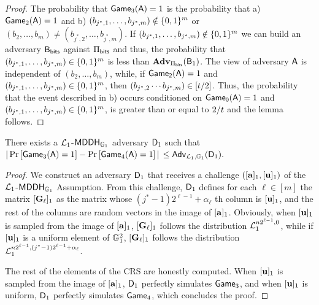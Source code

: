 \begin{proof}  The probability that
 \(\mathsf{Game}_3(\mathsf{A})=1\) is the probability that  a) \(\mathsf{Game}_2(\mathsf{A})=1\) and
b) \((b_{j^*,1},\ldots,b_{j^*,m})\notin\{0,1\}^m\) or \((b_2,\ldots, b_m) \neq (b_{j^*,2},\ldots, b_{j^*,m})\). If \((b_{j^*,1},\ldots,\allowbreak b_{j^*,m})\notin\{0,1\}^m\) we can build an adversary \(\mathsf{B}_{\mathsf{bits}}\) against \(\Pi_{\mathsf{bits}}\) and thus, the probability that \((b_{j^*,1},\ldots,b_{j^*,m})\in\{0,1\}^m\) is less than \(\mathbf{Adv}_{\Pi_{\mathsf{bits}}}(\mathsf{B}_1)\). The view of adversary \(\mathsf{A}\) is independent of \((b_{2},\ldots, b_{m})\), while, if \(\mathsf{Game_2}(\mathsf{A})=1\) and \((b_{j^*,1},\ldots,b_{j^*,m})\in\{0,1\}^{m}\), then \((b_{j^*,2}\cdots b_{j^*,m})\in[t /2]\). Thus, 
the probability that the event described in b) occurs conditioned on \(\mathsf{Game_0}(\mathsf{A})=1\) and \((b_{j^*,1},\ldots,b_{j^*,m})\in\{0,1\}^{m}\), is greater than or equal to \(2/t \) and the lemma follows.
\end{proof}

\begin{lemma} There exists a \(\mathcal{L}_1\)-\(\mathsf{MDDH}_{\mathbb{G}_1}\) adversary \(\mathsf{D}_1\) such that
\(|\Pr\left[\mathsf{Game}_{3}(\mathsf{A})=1\right]\allowbreak-\Pr\left[\mathsf{Game}_{4}(\mathsf{A})=1\right]|\) $\leq
    \mathsf{Adv}_{\mathcal{L}_1,\mathbb{G}_1}(\mathsf{D}_1).$
\label{lemma:bits2}
\end{lemma}

\begin{proof}
We construct an adversary \(\mathsf{D}_1\) that receives 
a challenge \(([\mathbf{a}]_1,[\mathbf{u}]_1)\) of the 
\(\mathcal{L}_1\)-\(\mathsf{MDDH}_{\mathbb{G}_1}\) Assumption. From this challenge, \(\mathsf{D}_1\) defines for each \(\ell\in [m]\) the matrix  \([\mathbf{{G}}_\ell]_1\) as the matrix whose  \((j^*-1)2^{\ell-1}+\alpha_\ell\) th column is \([\mathbf{u}]_1\), and the rest of the columns are random vectors in the image of \([\mathbf{a}]_1\). 
Obviously, when \([\mathbf{u}]_1\) is sampled from 
the image of \([\mathbf{a}]_1\), \([\mathbf{{G}}_\ell]_1\) follows the distribution \(\mathcal{L}_1^{n2^{\ell-1},0}\), while if \([\mathbf{u}]_1\) is a uniform element of \(\mathbb{G}^2_1\), \([\mathbf{{G}}_\ell]_1\) follows the distribution \(\mathcal{L}_1^{n2^{\ell-1},(j^*-1)2^{\ell-1}+\alpha_\ell}\). 
 
The rest of the elements of the CRS are honestly computed. When \([\mathbf{u}]_1\) is sampled from the image of \([\mathbf{{a}}]_1\), \(\mathsf{D}_1\) perfectly simulates \(\mathsf{Game}_3\), and when \([\mathbf{u}]_1\) is uniform, \(\mathsf{D}_1\) perfectly simulates \(\mathsf{Game}_4\), which concludes the proof. 
\end{proof}


